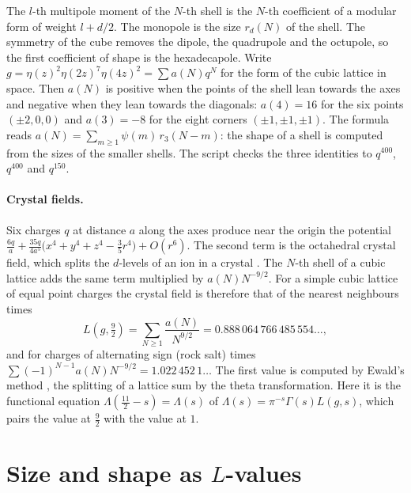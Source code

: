 \documentclass[11pt]{article}
\begin{document}
\physical
The $l$-th multipole moment of the $N$-th shell is the $N$-th coefficient of a modular form of weight $l+d/2$.
The monopole is the size $r_d(N)$ of the shell.
The symmetry of the cube removes the dipole, the quadrupole and the octupole, so the first coefficient of shape is the hexadecapole.
Write $g = \eta(z)^2\eta(2z)^7\eta(4z)^2 = \sum a(N)q^N$ for the form of the cubic lattice in space.
Then $a(N)$ is positive when the points of the shell lean towards the axes and negative when they lean towards the diagonals: $a(4) = 16$ for the six points $(\pm2,0,0)$ and $a(3) = -8$ for the eight corners $(\pm1,\pm1,\pm1)$.
The formula reads $a(N) = \sum_{m\ge1}\psi(m)\,r_3(N-m)$: the shape of a shell is computed from the sizes of the smaller shells.
The script checks the three identities to $q^{400}$, $q^{400}$ and $q^{150}$.

\paragraph{Crystal fields.}
Six charges $q$ at distance $a$ along the axes produce near the origin the potential
$\frac{6q}{a}+\frac{35q}{4a^5}\big(x^4+y^4+z^4-\tfrac35r^4\big)+O(r^6)$.
The second term is the octahedral crystal field, which splits the $d$-levels of an ion in a crystal \cite{Bethe}.
The $N$-th shell of a cubic lattice adds the same term multiplied by $a(N)N^{-9/2}$.
For a simple cubic lattice of equal point charges the crystal field is therefore that of the nearest neighbours times
\[
  L(g,\tfrac92) = \sum_{N\ge1}\frac{a(N)}{N^{9/2}} = 0.888\,064\,766\,485\,554\ldots,
\]
and for charges of alternating sign (rock salt) times $\sum(-1)^{N-1}a(N)N^{-9/2} = 1.022\,452\,1\ldots$
The first value is computed by Ewald's method \cite{Ewald}, the splitting of a lattice sum by the theta transformation.
Here it is the functional equation $\Lambda(\tfrac{11}{2}-s) = \Lambda(s)$ of $\Lambda(s) = \pi^{-s}\Gamma(s)L(g,s)$, which pairs the value at $\tfrac92$ with the value at $1$.

\section{Size and shape as $L$-values}
\end{document}
